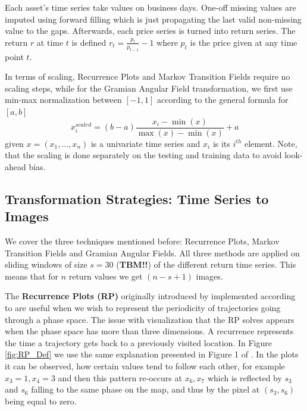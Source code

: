 \documentclass[11pt, a4paper]{article}
\begin{document}
Each asset's time series take values on business days. One-off missing values are imputed using forward filling which is just propagating the last valid non-missing value to the gaps. Afterwards, each price series is turned into return series. The return $r$ at time $t$ is defined $r_t = \frac{p_t}{p_{t-1}}-1$ where $p_t$ is the price given at any time point $t$.

In terms of scaling, Recurrence Plots and Markov Transition Fields require no scaling steps, while for the Gramian Angular Field transformation, we first use min-max normalization between $[-1, 1]$ according to the general formula for $[a, b]$
\begin{equation}
\label{eq:minmax}
    x^{scaled}_i =(b-a)\frac{x_i-\min(x)}{\max(x) - \min(x)} + a
\end{equation}
given $x = (x_1, \dots, x_n)$ is a univariate time series and $x_i$ is its $i^{th}$ element. Note, that the scaling is done separately on the testing and training data to avoid look-ahead bias.

\subsection{Transformation Strategies: Time Series to Images}
\label{subsec:DM:TS2IM}

We cover the three techniques mentioned before: Recurrence Plots, Markov Transition Fields and Gramian Angular Fields. All three methods are applied on sliding windows of size $s = 30$ (\textbf{TBM!!}) of the different return time series. This means that for $n$ return values we get $(n - s + 1)$ images. 

The \textbf{Recurrence Plots (RP)} originally introduced by \cite{jp1987recurrence} implemented according to \cite{hatami2018classification} are useful when we wish to represent the periodicity of trajectories going through a phase space. The issue with visualization that the RP solves appears when the phase space has more than three dimensions. A recurrence represents the time a trajectory gets back to a previously visited location. In Figure \ref{fig:RP_Def} we use the same explanation presented in Figure 1 of \cite{hatami2018classification}. In the plots it can be observed, how certain values tend to follow each other, for example $x_3 = 1, x_4 = 3$ and then this pattern re-occurs at $x_6, x_7$ which is reflected by $s_3$ and $s_6$ falling to the same phase on the map, and thus by the pixel at $(s_3, s_6)$ being equal to zero.
\end{document}
